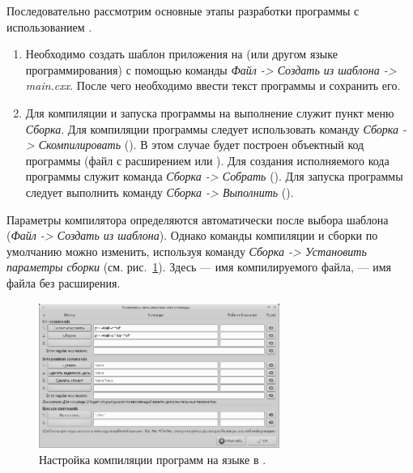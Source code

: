 Последовательно рассмотрим основные этапы разработки программы с использованием . 
\begin{enumerate}
\item Необходимо создать шаблон приложения на  (или другом языке программирования) с помощью 
команды \emph{Файл -> Создать из шаблона -> main.cxx}. После чего необходимо ввести текст 
программы и сохранить его. 
\item Для компиляции и запуска программы на выполнение служит пункт меню \emph{Сборка}. Для компиляции программы следует
использовать команду \emph{Сборка -> Скомпилировать} (). В этом случае будет построен объектный код программы (файл с расширением
 или ). Для создания исполняемого кода программы служит команда \emph{Сборка -> Собрать} ().  Для
запуска программы следует выполнить команду \emph{Сборка -> Выполнить} ().
\end{enumerate}

Параметры компилятора определяются автоматически после выбора шаблона (\emph{Файл -> Создать из шаблона}).
Однако команды компиляции и сборки по умолчанию можно изменить, используя команду \emph{Сборка -> Установить
параметры сборки} (см. рис.~\ref{app:refDrawing6}). Здесь  --- имя компилируемого файла, 
 --- имя файла без расширения.

\begin{figure}[htb]
\begin{center}
\includegraphics[width=0.7\textwidth]{img/ris_app_7}
\caption[Настройка компиляции программ на языке  в .]{Настройка компиляции программ на языке  в
.}
\label{app:refDrawing6}
\end{center}
\end{figure}

